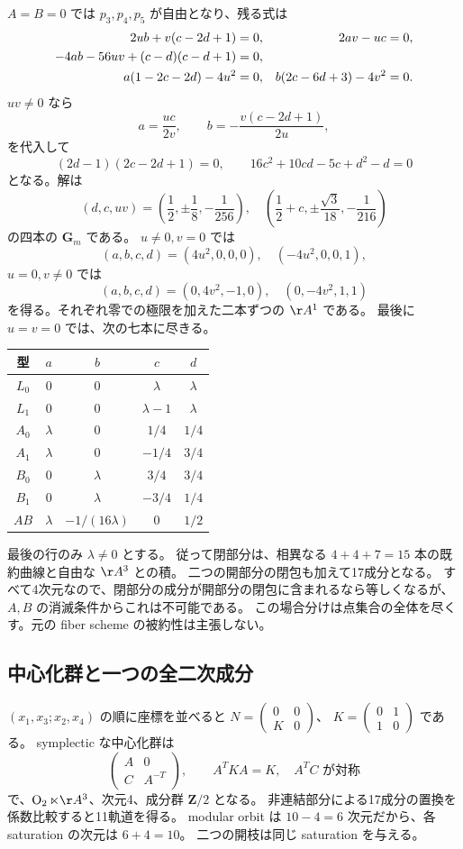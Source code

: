 $A=B=0$ では $p_3,p_4,p_5$ が自由となり、残る式は
\begin{align}
 2ub+v(c-2d+1)&=0,&2av-uc&=0,\notag\\
 -4ab-56uv+(c-d)(c-d+1)&=0,\label{eq:22core}\\
 a(1-2c-2d)-4u^2&=0,&b(2c-6d+3)-4v^2&=0.\notag
\end{align}
$uv\ne0$ なら
\[
 a=\frac{uc}{2v},\qquad b=-\frac{v(c-2d+1)}{2u},
\]
を代入して
\[
 (2d-1)(2c-2d+1)=0,\qquad
 16c^2+10cd-5c+d^2-d=0
\]
となる。解は
\[
 (d,c,uv)=\left(\frac12,\pm\frac18,-\frac1{256}\right),
 \quad
 \left(\frac12+c,\pm\frac{\sqrt3}{18},-\frac1{216}\right)
\]
の四本の $\mathbf G_m$ である。
$u\ne0,v=0$ では
\[
 (a,b,c,d)=(4u^2,0,0,0),\quad(-4u^2,0,0,1),
\]
$u=0,v\ne0$ では
\[
 (a,b,c,d)=(0,4v^2,-1,0),\quad(0,-4v^2,1,1)
\]
を得る。それぞれ零での極限を加えた二本ずつの $\AA^1$ である。
最後に $u=v=0$ では、次の七本に尽きる。
\begin{center}\small
\begin{tabular}{ccccc}
\toprule
型&$a$&$b$&$c$&$d$\\\midrule
$L_0$&0&0&$\lambda$&$\lambda$\\
$L_1$&0&0&$\lambda-1$&$\lambda$\\
$A_0$&$\lambda$&0&$1/4$&$1/4$\\
$A_1$&$\lambda$&0&$-1/4$&$3/4$\\
$B_0$&0&$\lambda$&$3/4$&$3/4$\\
$B_1$&0&$\lambda$&$-3/4$&$1/4$\\
$AB$&$\lambda$&$-1/(16\lambda)$&0&$1/2$\\\bottomrule
\end{tabular}
\end{center}
最後の行のみ $\lambda\ne0$ とする。
従って閉部分は、相異なる $4+4+7=15$ 本の既約曲線と自由な $\AA^3$ との積。
二つの開部分の閉包も加えて17成分となる。
すべて4次元なので、閉部分の成分が開部分の閉包に含まれるなら等しくなるが、
$A,B$ の消滅条件からこれは不可能である。
この場合分けは点集合の全体を尽くす。元の fiber scheme の被約性は主張しない。

\subsection{中心化群と一つの全二次成分}
$(x_1,x_3;x_2,x_4)$ の順に座標を並べると
$N=\left(\begin{smallmatrix}0&0\\K&0\end{smallmatrix}\right)$、
$K=\left(\begin{smallmatrix}0&1\\1&0\end{smallmatrix}\right)$ である。
symplectic な中心化群は
\[
 \begin{pmatrix}A&0\\C&A^{-T}\end{pmatrix},
 \qquad A^TKA=K,\quad A^TC\text{ が対称}
\]
で、$\operatorname O_2\ltimes\AA^3$、次元4、成分群 $\mathbf Z/2$ となる。
非連結部分による17成分の置換を係数比較すると11軌道を得る。
modular orbit は $10-4=6$ 次元だから、各 saturation の次元は $6+4=10$。
二つの開枝は同じ saturation を与える。

